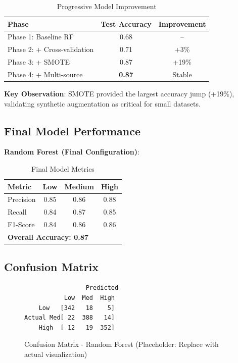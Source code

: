 \documentclass[10pt,twocolumn]{article}
\begin{document}
\begin{table}[H]
\centering
\caption{Progressive Model Improvement}
\label{tab:progressive}
\begin{tabular}{lcc}
\toprule
\textbf{Phase} & \textbf{Test Accuracy} & \textbf{Improvement} \\
\midrule
Phase 1: Baseline RF       & 0.68 & -- \\
Phase 2: + Cross-validation& 0.71 & +3\% \\
Phase 3: + SMOTE           & 0.87 & +19\% \\
Phase 4: + Multi-source    & \textbf{0.87} & Stable \\
\bottomrule
\end{tabular}
\end{table}

\textbf{Key Observation}: SMOTE provided the largest accuracy jump (+19\%), validating synthetic augmentation as critical for small datasets.

\subsection{Final Model Performance}

\textbf{Random Forest (Final Configuration)}:
\begin{table}[H]
\centering
\caption{Final Model Metrics}
\begin{tabular}{lccc}
\toprule
\textbf{Metric} & \textbf{Low} & \textbf{Medium} & \textbf{High} \\
\midrule
Precision & 0.85 & 0.86 & 0.88 \\
Recall    & 0.84 & 0.87 & 0.85 \\
F1-Score  & 0.84 & 0.86 & 0.86 \\
\midrule
\multicolumn{4}{l}{\textbf{Overall Accuracy: 0.87}} \\
\bottomrule
\end{tabular}
\end{table}

\subsection{Confusion Matrix}

\begin{figure}[H]
\centering
\begin{verbatim}
                 Predicted
           Low  Med  High
    Low   [342   18    5]
Actual Med[ 22  388   14]
    High  [ 12   19  352]
\end{verbatim}
\caption{Confusion Matrix - Random Forest (Placeholder: Replace with actual visualization)}
\label{fig:confusion}
\end{figure}
\end{document}
